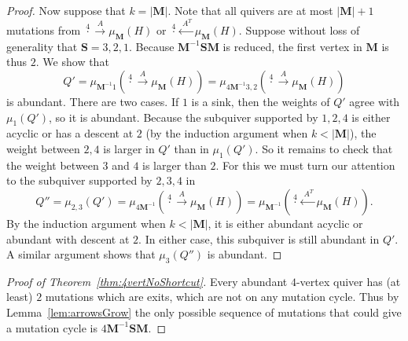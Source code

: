 \documentclass[11pt, letterpaper]{amsart}
\theoremstyle{definition}
\numberwithin{equation}{section}
\begin{document}
\begin{proof}
Now suppose that $k=|\mathbf M|$. Note that all quivers are at most $|\mathbf M|+1$ mutations from $\stackrel{4}{\cdot} \stackrel{A}{\rightarrow} \mu_{\mathbf M}(H)$ or $\stackrel{4}{\cdot} \stackrel{\hspace{3pt} A^T}{\leftarrow} \mu_{\mathbf M}(H)$.
Suppose without loss of generality that $\mathbf S=3,2,1$.
Because $\mathbf M^{-1} \mathbf S \mathbf M$ is reduced, the first vertex in $\mathbf M$ is thus $2$.
We show that 
$$Q' = \mu_{\mathbf M^{-1}1}(\stackrel{4}{\cdot} \stackrel{A}{\rightarrow} \mu_{\mathbf M}(H)) = \mu_{4\mathbf M^{-1}3,2}(\stackrel{4}{\cdot} \stackrel{A}{\rightarrow} \mu_{\mathbf M}(H))$$
is abundant.
There are two cases.
If $1$ is a sink, then the weights of $Q'$ agree with $\mu_1(Q')$, so it is abundant.
Because the subquiver supported by $1,2,4$ is either acyclic or has a descent at $2$ (by the induction argument when $k < |\mathbf M|$), the weight between $2,4$ is larger in $Q'$ than in $\mu_1(Q')$.
So it remains to check that the weight between $3$ and $4$ is larger than $2$.
For this we must turn our attention to the subquiver supported by $2,3,4$ in 
$$Q'' = \mu_{2,3}(Q') = \mu_{4\mathbf M^{-1}}(\stackrel{4}{\cdot} \stackrel{A}{\rightarrow} \mu_{\mathbf M}(H)) = \mu_{\mathbf M^{-1}}(\stackrel{4}{\cdot} \stackrel{\hspace{3pt} A^T}{\leftarrow} \mu_{\mathbf M}(H)).$$ 
By the induction argument when $k < |\mathbf M|$, it is either abundant acyclic or abundant with descent at $2$. 
In either case, this subquiver is still abundant in $Q'$.
A similar argument shows that $\mu_3(Q'')$ is abundant.
\end{proof}

\begin{proof}[Proof of Theorem~\ref{thm:4vertNoShortcut}]
Every abundant $4$-vertex quiver has (at least) $2$ mutations which are exits, which are not on any mutation cycle.
Thus by Lemma~\ref{lem:arrowsGrow} the only possible sequence of mutations that could give a mutation cycle is $4\mathbf M^{-1} \mathbf S \mathbf M$.
\end{proof}
\end{document}
